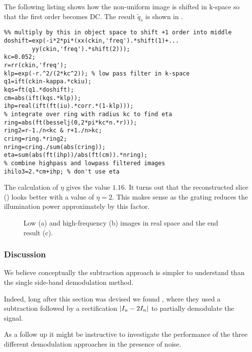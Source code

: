 The following listing shows how the non-uniform image is shifted in
k-space so that the first order becomes DC. The result $\tilde q_s$
is shown in .
\begin{lstlisting}
%% multiply by this in object space to shift +1 order into middle
doshift=exp(-i*2*pi*(xx(ckin,'freq').*shift(1)+...
        yy(ckin,'freq').*shift(2)));
kc=0.052;
r=rr(ckin,'freq');
klp=exp(-r.^2/(2*kc^2)); % low pass filter in k-space
q1=ift(ckin-kappa.*ckiu);
kqs=ft(q1.*doshift);
cm=abs(ift(kqs.*klp));
ihp=real(ift(ft(iu).*corr.*(1-klp)));
% integrate over ring with radius kc to find eta
ring=abs(ft(besselj(0,2*pi*kc*n.*r)));
ring2=r-1./n<kc & r+1./n>kc;
cring=ring.*ring2;
nring=cring./sum(abs(cring));
eta=sum(abs(ft(ihp))/abs(ft(cm)).*nring);
% combine highpass and lowpass filtered images
ihilo3=2.*cm+ihp; % don't use eta
\end{lstlisting}
The calculation of $\eta$ gives the value $1.16$. It turns out that
the reconstructed slice () looks better with a
value of $\eta=2$. This makes sense as the grating reduces the
illumination power approximately by this factor.
\begin{figure}[htb]
  \centering {}
  \caption{Low (a) and high-frequency (b) images in real space and the
    end result (c).}
  \label{fig:hilo3_3}
\end{figure}
\subsubsection{Discussion}
We believe conceptually the subtraction approach is simpler to
understand than the single side-band demodulation method. 

Indeed, long after this section was devised we found \cite{Mertz2010},
where they used a subtraction followed by a rectification
$\mathopen| I_u-2I_n \mathclose|$ to partially demodulate the signal.

As a follow up it might be instructive to investigate the performance
of the three different demodulation approaches in the presence of
noise.

